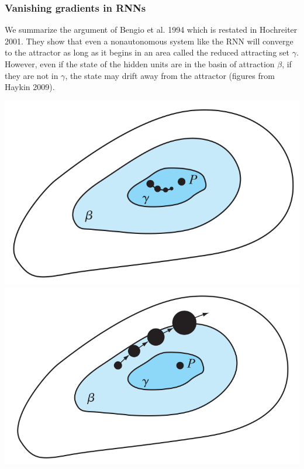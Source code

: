 \documentclass{beamer}
\begin{document}
\begin{frame}
  \frametitle{Vanishing gradients in RNNs}
  We summarize the argument of Bengio et al. 1994 which is restated in Hochreiter 2001. They show that even a nonautonomous system like the RNN will converge to the attractor as long as it begins in an area called the reduced attracting set $\gamma$. However, even if the state of the hidden units are in the basin of attraction $\beta$, if they are not in $\gamma$, the state may drift away from the attractor (figures from Haykin 2009).

\begin{center}
\includegraphics[scale=0.20]{bengio_picture.png} \includegraphics[scale=0.20]{bengio_picture2.png}
\end{center}

\end{frame}
\end{document}
